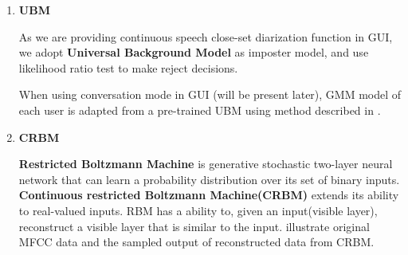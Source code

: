 \begin{enumerate}
		\item \textbf{UBM}

			As we are providing continuous speech close-set diarization function in
			GUI, we adopt \textbf{Universal Background Model} as imposter model,
			and use likelihood ratio test to make reject
			decisions.\cite{reynolds2000speaker}

			When using conversation mode in GUI (will be present later),
			GMM model of each user is adapted from a pre-trained UBM
			using method described in \cite{reynolds2000speaker}.

		\item \textbf{CRBM}

          \textbf{Restricted Boltzmann Machine} is generative stochastic
			two-layer neural network that can learn a probability distribution
			over its set of binary inputs\cite{rbm_wiki}.  \textbf{Continuous
			restricted Boltzmann Machine(CRBM)}\cite{chen2003continuous} extends
			its ability to real-valued inputs.  RBM has a ability to, given an
			input(visible layer), reconstruct a visible layer that is similar
			to the input.   illustrate original MFCC data and the
			sampled output of
			reconstructed data from CRBM.


\end{enumerate}
